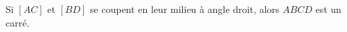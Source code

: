 Si $[AC]$ et $[BD]$ se coupent en leur milieu à angle droit, alors $ABCD$ est un carré.

\begin{reponses}
\end{reponses}

